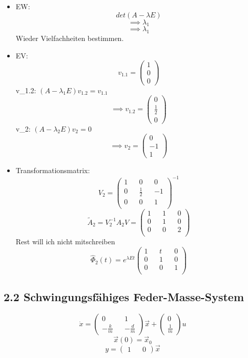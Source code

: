\documentclass[a4paper]{article}
\begin{document}
\begin{itemize}
    \item EW:
        \[ det(A-\lambda E) \]
            \[\implies \lambda_{1}\]     
            \[\implies \lambda_{1}\]     
            Wieder Vielfachheiten bestimmen.
    \item EV:
        \[ v_{1.1}=\begin{pmatrix} 1\\ 0\\ 0\end{pmatrix} \]
        v_{1.2}: $(A-\lambda_{1}E)v_{1.2}=v_{1.1}$
         \[ \implies v_{1.2}=\begin{pmatrix} 0\\ \frac{1}{2}\\ 0\end{pmatrix} \]
        v_{2}: $(A-\lambda_{2}E)v_{2}=0$ 
        \[ \implies v_{2}=\begin{pmatrix} 0\\ -1\\ 1\end{pmatrix} \]
    \item Transformationsmatrix:
        \[ V_{2}=
        \begin{pmatrix}
        1 && 0 && 0\\
        0 && \frac{1}{2} && -1\\
        0 && 0 && 1\\
        \end{pmatrix}^{-1}
    \]
    \[ \tilde{A}_{2}=V_{2}^{-1}A_{2}V
        =\begin{pmatrix}
        1 && 1 && 0\\
        0 && 1 && 0\\
        0 && 0 && 2\\
        \end{pmatrix} 
    \]
    Rest will ich nicht mitschreiben
    \[ \hat{\Phi}_{2}(t)=e^{\lambda Et}\begin{pmatrix}
    1 && t && 0\\
    0 && 1 && 0\\
    0 && 0 && 1\\
    \end{pmatrix}  \]
    
\end{itemize}

\subsection*{2.2 Schwingungsfähiges Feder-Masse-System}
\[ \dot x =\begin{pmatrix}
0 && 1\\
-\frac{k}{m} && -\frac{d}{m}
\end{pmatrix} \vec{x} + \begin{pmatrix} 0\\ \frac{1}{m}\end{pmatrix}u\]
\[ \vec{x}(0)=\vec{x}_{0} \]
\[ y=\begin{pmatrix} 1&& 0\end{pmatrix} \vec{x} \]
\end{document}
